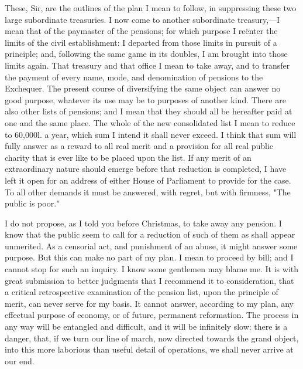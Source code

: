 These, Sir, are the outlines of the plan I mean to follow, in suppressing these two large subordinate treasuries. I now come to another subordinate treasury,—I mean that of the paymaster of the pensions; for which purpose I reënter the limits of the civil establishment: I departed from those limits in pursuit of a principle; and, following the same game in its doubles, I am brought into those limits again. That treasury and that office I mean to take away, and to transfer the payment of every name, mode, and denomination of pensions to the Exchequer. The present course of diversifying the same object can answer no good purpose, whatever its use may be to purposes of another kind. There are also other lists of pensions; and I mean that they should all be hereafter paid at one and the same place. The whole of the new consolidated list I mean to reduce to 60,000l. a year, which sum I intend it shall never exceed. I think that sum will fully answer as a reward to all real merit and a provision for all real public charity that is ever like to be placed upon the list. If any merit of an extraordinary nature should emerge before that reduction is completed, I have left it open for an address of either House of Parliament to provide for the case. To all other demands it must be answered, with regret, but with firmness, "The public is poor."

I do not propose, as I told you before Christmas, to take away any pension. I know that the public seem to call for a reduction of such of them as shall appear unmerited. As a censorial act, and punishment of an abuse, it might answer some purpose. But this can make no part of my plan. I mean to proceed by bill; and I cannot stop for such an inquiry. I know some gentlemen may blame me. It is with great submission to better judgments that I recommend it to consideration, that a critical retrospective examination of the pension list, upon the principle of merit, can never serve for my basis. It cannot answer, according to my plan, any effectual purpose of economy, or of future, permanent reformation. The process in any way will be entangled and difficult, and it will be infinitely slow: there is a danger, that, if we turn our line of march, now directed towards the grand object, into this more laborious than useful detail of operations, we shall never arrive at our end.

